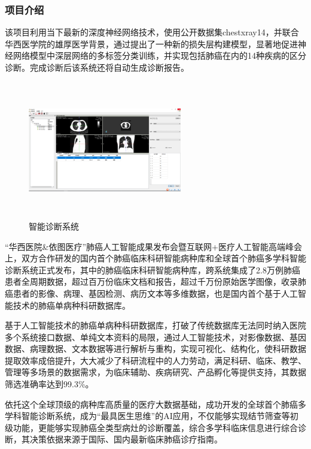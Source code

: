 \documentclass{xcumcmart}
\begin{document}
\subsubsection{项目介绍}
\par 该项目利用当下最新的深度神经网络技术，使用公开数据集chestxray14，并联合华西医学院的雄厚医学背景，通过提出了一种新的损失层构建模型，显著地促进神经网络模型中深层网络的多标签分类训练，并实现包括肺癌在内的14种疾病的区分诊断。完成诊断后该系统还将自动生成诊断报告。 
\begin{figure}[htbp]
    \centering
    \includegraphics[width=0.6\textwidth,height=6cm]{fig/1.png}
    \caption{智能诊断系统\label{fig:py.jpeg}}
\end{figure}
\par “华西医院\&依图医疗”肺癌人工智能成果发布会暨互联网+医疗人工智能高端峰会上，双方合作研发的国内首个肺癌临床科研智能病种库和全球首个肺癌多学科智能诊断系统正式发布，其中的肺癌临床科研智能病种库，跨系统集成了2.8万例肺癌患者全周期数据，超过百万份临床文档和报告，超过千万份原始医学图像，收录肺癌患者的影像、病理、基因检测、病历文本等多维数据，也是国内首个基于人工智能技术的肺癌单病种科研数据库\cite{3}。
\par 基于人工智能技术的肺癌单病种科研数据库，打破了传统数据库无法同时纳入医院多个系统接口数据、单纯文本资料的局限，通过人工智能技术，对影像数据、基因数据、病理数据、文本数据等进行解析与重构，实现可视化、结构化，使科研数据提取效率成倍提升，大大减少了科研流程中的人力劳动，满足科研、临床、教学、管理等多场景的数据需求，为临床辅助、疾病研究、产品孵化等提供支持，其数据筛选准确率达到99.3\%。
\par 依托这个全球顶级的病种库高质量的医疗大数据基础，成功开发的全球首个肺癌多学科智能诊断系统，成为“最具医生思维”的AI应用，不仅能够实现结节筛查等初级功能，更能够实现肺癌全类型病灶的诊断覆盖，综合多学科临床信息进行综合诊断，其决策依据来源于国际、国内最新临床肺癌诊疗指南。
\end{document}
